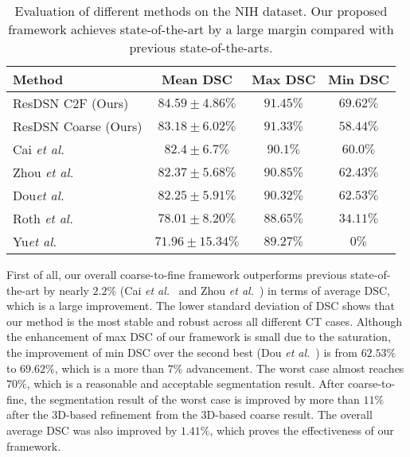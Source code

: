 \documentclass[10pt,twocolumn,letterpaper]{article}
\begin{document}
\begin{table}[tb]
\footnotesize
\begin{center}
\begin{tabular}{lccc}\toprule
Method           & {Mean DSC}       		& {Max DSC}    		& {Min DSC} \\
\hline
{ResDSN C2F (Ours)}  		& $\bm{84.59\pm{4.86}}\%$ 				& $\bm{91.45}\%$       	&$\bm{69.62}\%$ \\
{ResDSN Coarse (Ours)}  		& $83.18\pm{6.02}\%$ 				& $91.33\%$       	&$58.44\%$ \\
\hline
{Cai \emph{et al.}~\cite{cai2017improving}}   & $82.4\pm{6.7}\%$          & $90.1\%$          & $60.0\%$          \\
{Zhou \emph{et al.}~\cite{zhou2017fixed}} 	& $82.37\pm{5.68}\%$ 				&$90.85\%$ 			& $62.43\%$\\
{Dou\footnotemark[1] \emph{et al.}~\cite{dou20173d}} &$82.25\pm{5.91}\%$ 				&$90.32\%$			&$62.53\%$ \\
{Roth \emph{et al.}~\cite{roth2016spatial}}		&$78.01\pm{8.20}\%$ 				&$88.65\%$			&$34.11\%$ \\
{Yu\footnotemark[1] \emph{et al.}~\cite{yu2017automatic}} &$71.96\pm{15.34}\%$ 				&$89.27\%$			&$0\%$ \\
\bottomrule
\end{tabular}
\end{center}
\caption{
    Evaluation of different methods on the NIH dataset. Our proposed framework achieves state-of-the-art by a large margin compared with previous state-of-the-arts.
}
\label{Tab:NIHC2FSegmentation}
\end{table}


First of all, our overall coarse-to-fine framework outperforms previous state-of-the-art by nearly $2.2\%$ (Cai \emph{et al.}~\cite{cai2017improving} and Zhou \emph{et al.}~\cite{zhou2017fixed}) in terms of average DSC, which is a large improvement. The lower standard deviation of DSC shows that our method is the most stable and robust across all different CT cases. Although the enhancement of max DSC of our framework is small due to the saturation, the improvement of min DSC over the second best (Dou \emph{et al.}~\cite{dou20173d}) is from $62.53\%$ to $69.62\%$, which is a more than $7\%$ advancement. The worst case almost reaches $70\%$, which is a reasonable and acceptable segmentation result. After coarse-to-fine, the segmentation result of the worst case is improved by more than $11\%$ after the 3D-based refinement from the 3D-based coarse result. The overall average DSC was also improved by $1.41\%$, which proves the effectiveness of our framework.
\end{document}
